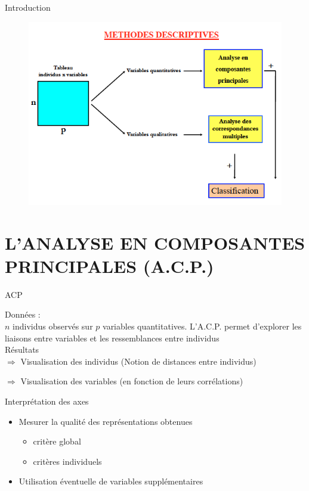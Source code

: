 \documentclass[11pt]{beamer}
\begin{document}
\begin{frame}{Introduction}
\begin{figure}
\includegraphics[scale=0.5]{schema1.png} 
\end{figure}
\end{frame}


\section{L’ANALYSE EN
COMPOSANTES PRINCIPALES
(A.C.P.)}

\begin{frame}{ACP}

Données : \\

$n$ individus observés sur $p$ variables quantitatives.
L’A.C.P. permet d’explorer les liaisons entre variables et les
ressemblances entre individus\\


Résultats\\

$\Rightarrow$ Visualisation des individus (Notion de distances entre individus)
 
$ \Rightarrow$ Visualisation des variables (en fonction de leurs corrélations)
\end{frame}

\begin{frame}{Interprétation des axes}

\begin{itemize}
\item Mesurer la qualité des représentations obtenues
\begin{itemize}
\item critère global
\item critères individuels
\end{itemize}
\item Utilisation éventuelle de variables supplémentaires
\end{itemize}
\end{frame}
\end{document}
